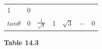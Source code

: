 {\begin{center}
\begin{xtabular*}{\mytablewidth}[t]{|p{10\mystarwidth}|p{10\mystarwidth}|p{10\mystarwidth}|p{10\mystarwidth}|p{10\mystarwidth}|p{10\mystarwidth}|p{10\mystarwidth}|}
        1 &
        0%
     \tabularnewline{}
                \begin{math}tan\theta \end{math}
               &
        0 &
                \begin{math}\frac{1}{\sqrt{3}}\end{math}
               &
        1 &
                \begin{math}\sqrt{3}\end{math}
               &
                \begin{math}-\end{math}
               &
        0%
     \tabularnewline{}
    \end{xtabular*}
      \end{center}
    \begin{center}{\small\bfseries Table 14.3}\end{center}
        }%
